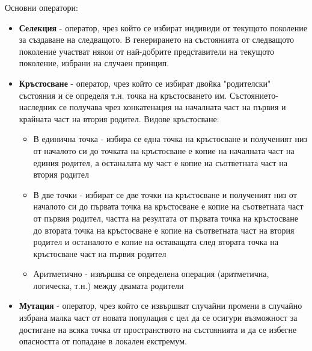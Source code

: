\documentclass{article}
\begin{document}
Основни оператори:
\begin{itemize}
    \item \textbf{Селекция} - оператор, чрез който се избират индивиди от текущото поколение за създаване на следващото. В
    генерирането на състоянията от следващото поколение участват някои от най-добрите представители на текущото поколение,
    избрани на случаен принцип.
    \item \textbf{Кръстосване} - оператор, чрез който се избират двойка "родителски" състояния и се определя т.н. точка на
    кръстосването им. Състоянието-наследник се получава чрез конкатенация на началната част на първия и крайната част на
    втория родител.
    Видове кръстосване:
    \begin{itemize}
        \item В единична точка - избира се една точка на кръстосване и полученият низ от началото си до точката на кръстосване е
        копие на началната част на единия родител, а останалата му част е копие на съответната част на втория родител
        \item В две точки - избират се две точки на кръстосване и полученият низ от началото си до първата точка на кръстосване е
        копие на съответната част от първия родител, частта на резултата от първата точка на кръстосване до втората точка на
        кръстосване е копие на съответната част на втория родител и останалото е копие на оставащата след втората точка на
        кръстосване част на първия родител
        \item Аритметично - извършва се определена операция (аритметична, логическа, т.н.) между двамата родители
    \end{itemize}
    \item \textbf{Мутация} - оператор, чрез който се извършват случайни промени в случайно избрана малка част от новата популация с
    цел да се осигури възможност за достигане на всяка точка от пространството на състоянията и да се избегне опасността от
    попадане в локален екстремум.
\end{itemize}
\end{document}
